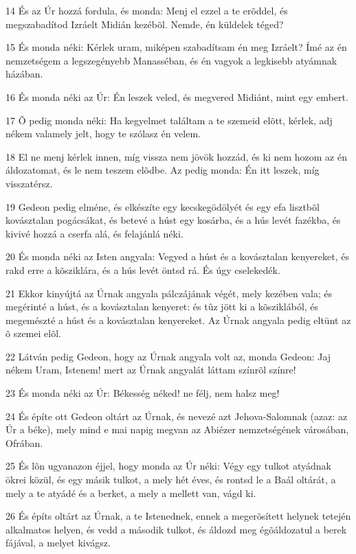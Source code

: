 \par 14 És az Úr hozzá fordula, és monda: Menj el ezzel a te erõddel, és megszabadítod Izráelt Midián kezébõl. Nemde, én küldelek téged?
\par 15 És monda néki: Kérlek uram, miképen szabadítsam én meg Izráelt? Ímé az én nemzetségem a legszegényebb Manasséban, és én vagyok a legkisebb atyámnak házában.
\par 16 És monda néki az Úr: Én leszek veled, és megvered Midiánt, mint egy embert.
\par 17 Õ pedig monda néki: Ha kegyelmet találtam a te szemeid elõtt, kérlek, adj nékem valamely jelt, hogy te szólasz én velem.
\par 18 El ne menj kérlek innen, míg vissza nem jövök hozzád, és ki nem hozom az én áldozatomat, és le nem teszem elõdbe. Az pedig monda: Én itt leszek, míg visszatérsz.
\par 19 Gedeon pedig elméne, és elkészíte egy kecskegödölyét és egy efa lisztbõl kovásztalan pogácsákat, és betevé a húst egy kosárba, és a hús levét fazékba, és kivivé hozzá a cserfa alá, és felajánlá néki.
\par 20 És monda néki az Isten angyala: Vegyed a húst és a kovásztalan kenyereket, és rakd erre a kõsziklára, és a hús levét öntsd rá. És úgy cselekedék.
\par 21 Ekkor kinyújtá az Úrnak angyala pálczájának végét, mely kezében vala; és megérinté a húst, és a kovásztalan kenyeret: és tûz jött ki a kõsziklából, és megemészté a húst és a kovásztalan kenyereket. Az Úrnak angyala pedig eltünt az õ szemei elõl.
\par 22 Látván pedig Gedeon, hogy az Úrnak angyala volt az, monda Gedeon: Jaj nékem Uram, Istenem! mert az Úrnak angyalát láttam színrõl színre!
\par 23 És monda néki az Úr: Békesség néked! ne félj, nem halsz meg!
\par 24 És építe ott Gedeon oltárt az Úrnak, és nevezé azt Jehova-Salomnak (azaz: az Úr a béke), mely mind e mai napig megvan az Abiézer nemzetségének városában, Ofrában.
\par 25 És lõn ugyanazon éjjel, hogy monda az Úr néki: Végy egy tulkot atyádnak ökrei közül, és egy másik tulkot, a mely hét éves, és rontsd le a Baál oltárát, a mely a te atyádé és a berket, a mely a mellett van, vágd ki.
\par 26 És építs oltárt az Úrnak, a te Istenednek, ennek a megerõsített helynek tetején alkalmatos helyen, és vedd a második tulkot, és áldozd meg égõáldozatul a berek fájával, a melyet kivágsz.
